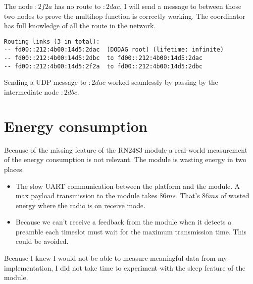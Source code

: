

The node $:2f2a$ has no route to $:2dac$, I will send a message to between
those two nodes to prove the multihop function is correctly working.
The coordinator has full knowledge of all the route in the network.

\begin{lstlisting}
Routing links (3 in total):
-- fd00::212:4b00:14d5:2dac  (DODAG root) (lifetime: infinite)
-- fd00::212:4b00:14d5:2dbc  to fd00::212:4b00:14d5:2dac
-- fd00::212:4b00:14d5:2f2a  to fd00::212:4b00:14d5:2dbc
\end{lstlisting}

Sending a UDP message to $:2dac$ worked seamlessly by passing by the
intermediate node $:2dbc$.

\section{Energy consumption\label{section:energyconsumption}}

Because of the missing feature of the RN2483 module a real-world measurement of
the energy consumption is not relevant.
The module is wasting energy in two places.

\begin{itemize}
  \item The slow UART communication between the platform and the module. A max 
    payload transmission to the module takes $86 ms$.  That's $86 ms$ of wasted 
    energy where the radio is on receive mode.
  \item Because we can't receive a feedback from the module when it detects a
    preamble each timeslot must wait for the maximum transmission time. This could
    be avoided.
\end{itemize}

Because I knew I would not be able to measure meaningful data from my
implementation, I did not take time to experiment with the sleep feature of the
module.
